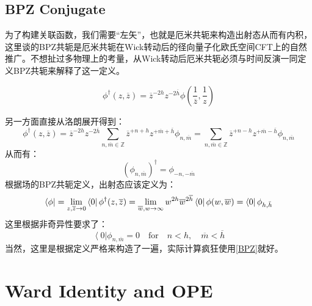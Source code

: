 \subsection{BPZ Conjugate}
为了构建关联函数，我们需要“左矢”，也就是厄米共轭来构造出射态从而有内积，这里谈的BPZ共轭是厄米共轭在Wick转动后的径向量子化欧氏空间CFT上的自然推广。不想扯过多物理上的考量，\cite{ito}从Wick转动后厄米共轭必须与时间反演一同定义BPZ共轭来解释了这一定义。
\begin{definition}
	\begin{equation}
		\phi^\dagger(z,\overline{z})=\overline{z}^{-2h}z^{-2\overline{h}}\phi\left(\frac{1}{\overline{z}},\frac{1}{z}\right)
	\end{equation}
\end{definition}
另一方面直接从洛朗展开得到：
\begin{equation}
	\phi^{\dagger}(z,\overline{z})=\overline{z}^{-2h}z^{-2\overline{h}}\sum_{n,\overline{m}\in\mathbb{Z}}\overline{z}^{+n+h}z^{+\overline{m}+\overline{h}}\phi_{n,\overline{m}}=\sum_{n,\overline{m}\in\mathbb{Z}}\overline{z}^{+n-h}z^{+\overline{m}-\overline{h}}\phi_{n,\overline{m}}
\end{equation}
从而有：
\begin{equation}\label{BPZ}
	\boxed{
	\left(\phi_{n,\overline{m}}\right)^\dagger=\phi_{-n,-\overline{m}}
	}
\end{equation}
根据场的BPZ共轭定义，出射态应该定义为：
\begin{equation}
	\bra{\phi}=\lim\limits_{z,\overline{z}\to0}\bra{ 0  }              \phi^\dagger(z,\overline{z})=\lim\limits_{\overline{w},w\to\infty}w^{2h}\overline{w}^{2\overline{h}}\bra{0}\phi(w,\overline{w})=\bra{0}\phi_{h,\bar h}
\end{equation}
这里根据非奇异性要求了：
\begin{equation}\label{eq:30.17}
	\left<0\right|\phi_{n,\overline{m}}=0\quad\text{for}\quad n<h,\quad\overline{m}<\overline{h}
\end{equation}
当然，这里是根据定义严格来构造了一遍，实际计算疯狂使用\ref{BPZ}就好。
\section{Ward Identity and OPE}
